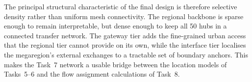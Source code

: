 The principal structural characteristic of the final design is therefore selective
density rather than uniform mesh connectivity. The regional backbone is sparse enough to
remain interpretable, but dense enough to keep all 50 hubs in a connected transfer
network. The gateway tier adds the fine-grained urban access that the regional tier
cannot provide on its own, while the interface tier localises the megaregion's external
exchanges to a tractable set of boundary anchors. This makes the Task~7 network a usable
bridge between the location models of Tasks~5--6 and the flow assignment calculations of
Task~8.
